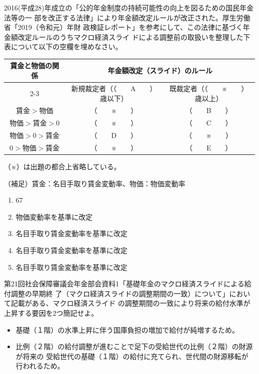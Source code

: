 \begin{fillblank}[年金2 2023 問題1(4)]
  2016(平成28)年成立の「公的年金制度の持続可能性の向上を図るための国民年金法等の一
部を改正する法律」により年金額改定ルールが改正された。厚生労働省「2019（令和元）年財
政検証レポート」を参考にして、この法律に基づく年金額改定ルールのうちマクロ経済スライ
ドによる調整前の取扱いを整理した下表について以下の空欄を埋めなさい。

  \begin{table}[htbp]
    \centering
    \begin{tabular}{|c|c|c|} \hline 
      \multirow{2}{*}{賃金と物価の関係} &   \multicolumn{2}{|c|}{年金額改定（スライド）のルール} \\ 
      \cline{2-3} & 新規裁定者（（　　A　　）歳以下） & 既裁定者（（　　※　　）歳以上） \\ \hline
      $賃金 > 物価$ & （　　※　　） & （　　B　　） \\ \hline
      $物価 > 賃金 > 0$ & （　　※　　） & （　　C　　） \\ \hline
      $物価 > 0 > 賃金$ & （　　D　　） & （　　※　　） \\ \hline
      $0 > 物価 > 賃金$& （　　※　　） & （　　E　　） \\ \hline
    \end{tabular}
  \end{table}

  （※）は出題の都合上省略している。

  （補足）賃金：名目手取り賃金変動率、物価：物価変動率
\end{fillblank}

\begin{answerbox}
  \begin{enumerate}[A: ]
    \item 67
    \item 物価変動率を基準に改定
    \item 名目手取り賃金変動率を基準に改定
    \item 名目手取り賃金変動率を基準に改定
    \item 名目手取り賃金変動率を基準に改定
  \end{enumerate}
\end{answerbox}

\begin{shortanswer}[数理人試験 2025 問題3 設問2]
  第21回社会保障審議会年金部会資料1「基礎年金のマクロ経済スライドによる給付調整の早期終
了（マクロ経済スライドの調整期間の一致）について」において記載がある、マクロ経済スライド
の調整期間の一致により将来の給付水準が上昇する要因を2つ簡記せよ。
\end{shortanswer}

\begin{answerbox}
  \begin{itemize}
    \item 基礎（１階）の水準上昇に伴う国庫負担の増加で給付が純増するため。
\item 比例（２階）の給付調整が進むことで足下の受給世代の比例（２階）の財源が将来の
受給世代の基礎（１階）の給付に充てられ、世代間の財源移転が行われるため。
  \end{itemize}
\end{answerbox}

\newpage